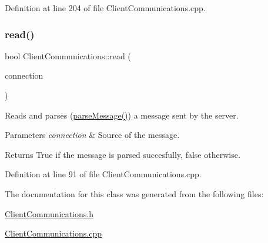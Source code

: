 Definition at line 204 of file Client\+Communications.\+cpp.

\hypertarget{classocra__recipes_1_1ClientCommunications_afbca8bd430e14a0b9a8254a29b78d202}{}\label{classocra__recipes_1_1ClientCommunications_afbca8bd430e14a0b9a8254a29b78d202} 
\subsubsection{\texorpdfstring{read()}{read()}}
{\footnotesize\ttfamily bool Client\+Communications\+::read (\begin{DoxyParamCaption}\item[{yarp\+::os\+::\+Connection\+Reader \&}]{connection }\end{DoxyParamCaption})\hspace{0.3cm}{\ttfamily [virtual]}}

Reads and parses (\hyperlink{classocra__recipes_1_1ClientCommunications_a452774799b5d8448a8ffd3ab5d24aa22}{parse\+Message()}) a message sent by the server.


\begin{DoxyParams}{Parameters}
{\em connection} & Source of the message.\\
\hline
\end{DoxyParams}
\begin{DoxyReturn}{Returns}
True if the message is parsed succesfully, false otherwise. 
\end{DoxyReturn}


Definition at line 91 of file Client\+Communications.\+cpp.



The documentation for this class was generated from the following files\+:\begin{DoxyCompactItemize}
\item 
\hyperlink{ClientCommunications_8h}{Client\+Communications.\+h}\item 
\hyperlink{ClientCommunications_8cpp}{Client\+Communications.\+cpp}\end{DoxyCompactItemize}
